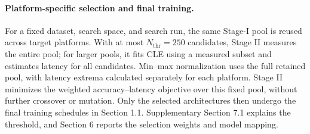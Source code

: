 \documentclass[preprint,review,12p,times]{elsarticle}
\begin{document}
\paragraph{Platform-specific selection and final training.}
For a fixed dataset, search space, and search run, the same Stage-I pool is reused across target platforms. With at most $N_{\mathrm{thr}}=250$ candidates, Stage II measures the entire pool; for larger pools, it fits CLE using a measured subset and estimates latency for all candidates. Min--max normalization uses the full retained pool, with latency extrema calculated separately for each platform. Stage II minimizes the weighted accuracy--latency objective over this fixed pool, without further crossover or mutation. Only the selected architectures then undergo the final training schedules in Section 1.1. Supplementary Section 7.1 explains the threshold, and Section 6 reports the selection weights and model mapping.
\endgroup
\end{document}
